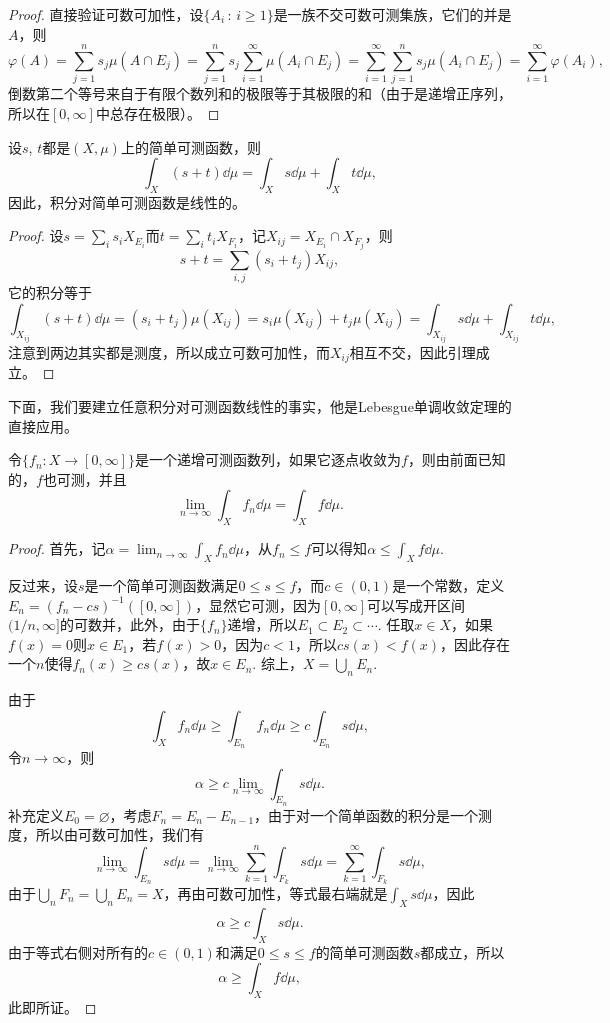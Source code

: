 \begin{proof}
直接验证可数可加性，设$\{A_i\,:\,i\geq 1\}$是一族不交可数可测集族，它们的并是$A$，则
\[
	\varphi(A)=\sum_{j=1}^ns_j\mu(A\cap E_j)=\sum_{j=1}^ns_j\sum_{i=1}^\infty \mu(A_i\cap E_j)=\sum_{i=1}^\infty \sum_{j=1}^ns_j \mu(A_i\cap E_j)=\sum_{i=1}^\infty\varphi(A_i),
\]
倒数第二个等号来自于有限个数列和的极限等于其极限的和（由于是递增正序列，所以在$[0,\infty]$中总存在极限）。
\end{proof}

\begin{lem}
设$s$, $t$都是$(X,\mu)$上的简单可测函数，则
\[
	\int_X (s+t)\dd \mu=\int_X s\dd \mu+\int_X t\dd \mu,
\]
因此，积分对简单可测函数是线性的。
\end{lem}

\begin{proof}
设$s=\sum_i s_i X_{E_i}$而$t=\sum_i t_i X_{F_i}$，记$X_{ij}=X_{E_i}\cap X_{F_j}$，则
\[
	s+t=\sum_{i,j}(s_i+t_j) X_{ij},
\]
它的积分等于
\[
	\int_{X_{ij}} (s+t)\dd \mu= (s_i+t_j)\mu(X_{ij})=s_i\mu(X_{ij})+t_j\mu(X_{ij})=\int_{X_{ij}} s\dd \mu+\int_{X_{ij}} t\dd \mu,
\]
注意到两边其实都是测度，所以成立可数可加性，而$X_{ij}$相互不交，因此引理成立。
\end{proof}

下面，我们要建立任意积分对可测函数线性的事实，他是Lebesgue单调收敛定理的直接应用。

\begin{thm}[Lebesgue单调收敛定理]
令$\{f_n:X\to [0,\infty]\}$是一个递增可测函数列，如果它逐点收敛为$f$，则由前面已知的，$f$也可测，并且
\[
	\lim_{n\to \infty} \int_X f_n \dd \mu=\int_X f \dd \mu.
\]
\end{thm}

\begin{proof}
首先，记$\alpha=\lim_{n\to \infty} \int_X f_n \dd \mu$，从$f_n\leq f$可以得知$\alpha\leq \int_X f \dd \mu$. 

反过来，设$s$是一个简单可测函数满足$0\leq s\leq f$，而$c\in (0,1)$是一个常数，定义$E_n=(f_n-cs)^{-1}([0,\infty])$，显然它可测，因为$[0,\infty]$可以写成开区间$(1/n,\infty]$的可数并，此外，由于$\{f_n\}$递增，所以$E_1\subset E_2\subset \cdots$. 任取$x\in X$，如果$f(x)=0$则$x\in E_1$，若$f(x)>0$，因为$c<1$，所以$cs(x)<f(x)$，因此存在一个$n$使得$f_n(x)\geq cs(x)$，故$x\in E_n$. 综上，$X=\bigcup_n E_n$.

由于
\[
	\int_X f_n \dd \mu\geq \int_{E_n} f_n \dd\mu\geq c\int_{E_n} s \dd\mu,
\]
令$n\to \infty$，则
\[
	\alpha \geq c\lim_{n\to \infty}\int_{E_n} s \dd\mu.
\]
补充定义$E_0=\varnothing$，考虑$F_n=E_{n}-E_{n-1}$，由于对一个简单函数的积分是一个测度，所以由可数可加性，我们有
\[
	\lim_{n\to \infty}\int_{E_n} s \dd\mu=\lim_{n\to \infty}\sum_{k=1}^n\int_{F_k} s \dd\mu=\sum_{k=1}^\infty\int_{F_k} s \dd\mu,
\]
由于$\bigcup_n F_n=\bigcup_n E_n=X$，再由可数可加性，等式最右端就是$\int_{X} s \dd\mu$，因此
\[
	\alpha \geq c\int_{X} s \dd\mu.
\]
由于等式右侧对所有的$c\in (0,1)$和满足$0\leq s\leq f$的简单可测函数$s$都成立，所以
\[
	\alpha \geq \int_{X} f \dd\mu,
\]
此即所证。
\end{proof}


